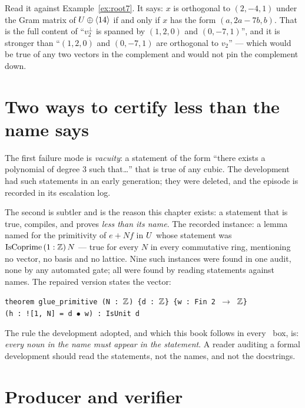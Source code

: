 Read it against Example~\ref{ex:root7}. It says: $x$ is orthogonal to
$(2,-4,1)$ under the Gram matrix of $U\oplus\langle 14\rangle$ if and only if $x$ has
the form $(a,2a-7b,b)$. That is the full content of ``$v_2^{\perp}$ is spanned
by $(1,2,0)$ and $(0,-7,1)$'', and it is stronger than ``$(1,2,0)$ and
$(0,-7,1)$ are orthogonal to $v_2$'' --- which would be true of any two vectors
in the complement and would not pin the complement down.

\section{Two ways to certify less than the name says}

The first failure mode is \emph{vacuity}: a statement of the form ``there
exists a polynomial of degree $3$ such that\ldots'' that is true of any cubic.
The development had such statements in an early generation; they were deleted,
and the episode is recorded in its escalation log.

The second is subtler and is the reason this chapter exists: a statement that
is true, compiles, and proves \emph{less than its name}. The recorded
instance: a lemma named for the primitivity of $e+Nf$ in $U$ whose statement
was $\mathrm{IsCoprime}\,(1:\mathbb{Z})\,N$ --- true for every $N$ in every commutative
ring, mentioning no vector, no basis and no lattice. Nine such instances were
found in one audit, none by any automated gate; all were found by reading
statements against names. The repaired version states the vector:

\begin{leanbox}
\texttt{theorem glue\_primitive (N : $\mathbb{Z}$) \{d : $\mathbb{Z}$\} \{w : Fin 2 $\to$ $\mathbb{Z}$\}}\\
\texttt{\quad (h : ![1, N] = d $\bullet$ w) : IsUnit d}
\end{leanbox}

The rule the development adopted, and which this book follows in every
\Kstatus\ box, is: \emph{every noun in the name must appear in the statement}.
A reader auditing a formal development should read the statements, not the
names, and not the docstrings.

\section{Producer and verifier}

